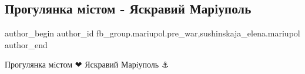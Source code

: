  
 
 
 
 

\subsection{Прогулянка мiстом - Яскравий Марiуполь}
\label{sec:19_02_2023.fb.fb_group.mariupol.pre_war.4.progulyanka_mistom__}
 
\ifcmt
 author_begin
   author_id fb_group.mariupol.pre_war,sushinskaja_elena.mariupol
 author_end
\fi

Прогулянка мiстом ❤ Яскравий Марiуполь ⚓

